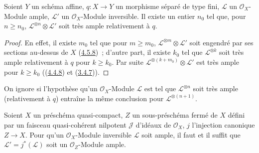 \begin{corollary}[4.5.11]
\label{II.4.5.11-fr}
Soient $Y$ un schéma affine, $q:X\to Y$ un morphisme séparé de type fini,
$\mathcal{L}$ un $\mathcal{O}_X$-Module ample, $\mathcal{L}'$ un
$\mathcal{O}_X$-Module inversible. Il existe un entier $n_0$ tel que, pour
$n\geq n_0$, $\mathcal{L}^{\otimes n}\otimes\mathcal{L}'$ soit très ample
relativement à $q$.
\end{corollary}

\begin{proof}
En effet, il existe $m_0$ tel que pour $m\geq m_0$,
$\mathcal{L}^{\otimes m}\otimes\mathcal{L}'$ soit engendré par ses sections
au-dessus de $X$ (\hyperref[II.4.5.8-fr]{4.5.8})~; d'autre part, il existe
$k_0$ tel que $\mathcal{L}^{\otimes k}$ soit très ample relativement à $q$
pour $k\geq k_0$. Par suite
$\mathcal{L}^{\otimes(k+m_0)}\otimes\mathcal{L}'$ est très ample pour
$k\geq k_0$ ((\hyperref[II.4.4.8-fr]{4.4.8}) et
(\hyperref[II.3.4.7-fr]{3.4.7})).
\end{proof}

\begin{remark}[4.5.12]
\label{II.4.5.12-fr}
On ignore si l'hypothèse qu'un $\mathcal{O}_X$-Module $\mathcal{L}$ est tel
que $\mathcal{L}^{\otimes n}$ soit très ample (relativement à $q$) entraîne
la même conclusion pour $\mathcal{L}^{\otimes(n+1)}$.
\end{remark}

\begin{proposition}[4.5.13]
\label{II.4.5.13-fr}
Soient $X$ un préschéma quasi-compact, $Z$ un sous-préschéma fermé de $X$
défini par un faisceau quasi-cohérent \textup{nilpotent} $\mathcal{J}$ d'idéaux de
$\mathcal{O}_X$, $j$ l'injection canonique $Z\to X$. Pour qu'un
$\mathcal{O}_X$-Module inversible $\mathcal{L}$ soit ample, il faut et il
suffit que $\mathcal{L}'=j^*(\mathcal{L})$ soit un
$\mathcal{O}_Z$-Module ample.
\end{proposition}

